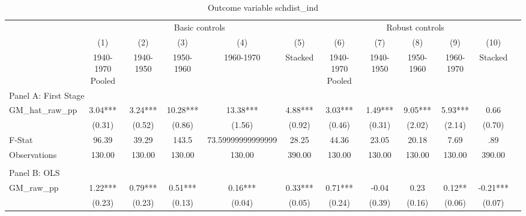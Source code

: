  \begin{table}[htbp]\centering {} \begin{threeparttable} \caption{Outcome variable schdist\_ind} \begin{tabular}{l*{11}{c}} \toprule
          &\multicolumn{5}{c}{Basic controls}                                   &\multicolumn{5}{c}{Robust controls}                                  \\\cmidrule(lr){2-6}\cmidrule(lr){7-11}
          &\multicolumn{1}{c}{(1)}&\multicolumn{1}{c}{(2)}&\multicolumn{1}{c}{(3)}&\multicolumn{1}{c}{(4)}&\multicolumn{1}{c}{(5)}&\multicolumn{1}{c}{(6)}&\multicolumn{1}{c}{(7)}&\multicolumn{1}{c}{(8)}&\multicolumn{1}{c}{(9)}&\multicolumn{1}{c}{(10)}\\
          &\multicolumn{1}{c}{1940-1970 Pooled}&\multicolumn{1}{c}{1940-1950}&\multicolumn{1}{c}{1950-1960}&\multicolumn{1}{c}{1960-1970}&\multicolumn{1}{c}{Stacked}&\multicolumn{1}{c}{1940-1970 Pooled}&\multicolumn{1}{c}{1940-1950}&\multicolumn{1}{c}{1950-1960}&\multicolumn{1}{c}{1960-1970}&\multicolumn{1}{c}{Stacked}\\
\cmidrule(lr){1-11}
\multicolumn{10}{l}{Panel A: First Stage}\\
\cmidrule(lr){1-11}
GM\_hat\_raw\_pp&      3.04***&      3.24***&     10.28***&     13.38***&      4.88***&      3.03***&      1.49***&      9.05***&      5.93***&      0.66   \\
          &    (0.31)   &    (0.52)   &    (0.86)   &    (1.56)   &    (0.92)   &    (0.46)   &    (0.31)   &    (2.02)   &    (2.14)   &    (0.70)   \\
\midrule
F-Stat    &     96.39   &     39.29   &     143.5   &73.59999999999999   &     28.25   &     44.36   &     23.05   &     20.18   &      7.69   &       .89   \\
Observations&    130.00   &    130.00   &    130.00   &    130.00   &    390.00   &    130.00   &    130.00   &    130.00   &    130.00   &    390.00   \\
\cmidrule[\heavyrulewidth](lr){1-11} \\ \cmidrule[\heavyrulewidth](lr){1-11}
\multicolumn{10}{l}{Panel B: OLS}\\
\cmidrule(lr){1-11}
GM\_raw\_pp &      1.22***&      0.79***&      0.51***&      0.16***&      0.33***&      0.71***&     -0.04   &      0.23   &      0.12** &     -0.21***\\
          &    (0.23)   &    (0.23)   &    (0.13)   &    (0.04)   &    (0.05)   &    (0.24)   &    (0.39)   &    (0.16)   &    (0.06)   &    (0.07)   \\

\end{tabular}
\end{threeparttable}
\end{table}
